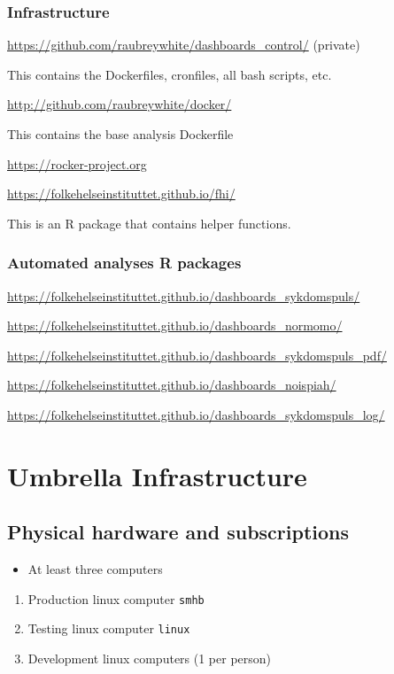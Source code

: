 \documentclass[12pt,]{article}
\providecommand{\tightlist}{%
  \setlength{\itemsep}{0pt}\setlength{\parskip}{0pt}}
\begin{document}
\subsubsection{Infrastructure}\label{infrastructure}

\url{https://github.com/raubreywhite/dashboards_control/} (private)

This contains the Dockerfiles, cronfiles, all bash scripts, etc.

\url{http://github.com/raubreywhite/docker/}

This contains the base analysis Dockerfile

\url{https://rocker-project.org}

\url{https://folkehelseinstituttet.github.io/fhi/}

This is an R package that contains helper functions.

\subsubsection{Automated analyses R
packages}\label{automated-analyses-r-packages}

\url{https://folkehelseinstituttet.github.io/dashboards_sykdomspuls/}

\url{https://folkehelseinstituttet.github.io/dashboards_normomo/}

\url{https://folkehelseinstituttet.github.io/dashboards_sykdomspuls_pdf/}

\url{https://folkehelseinstituttet.github.io/dashboards_noispiah/}

\url{https://folkehelseinstituttet.github.io/dashboards_sykdomspuls_log/}

\section{Umbrella Infrastructure}\label{umbrella-infrastructure}

\subsection{Physical hardware and
subscriptions}\label{physical-hardware-and-subscriptions}

\begin{itemize}
\tightlist
\item
  At least three computers
\end{itemize}

\begin{enumerate}
\def\labelenumi{\arabic{enumi}.}
\tightlist
\item
  Production linux computer \texttt{smhb}
\item
  Testing linux computer \texttt{linux}
\item
  Development linux computers (1 per person)
\end{enumerate}
\end{document}
